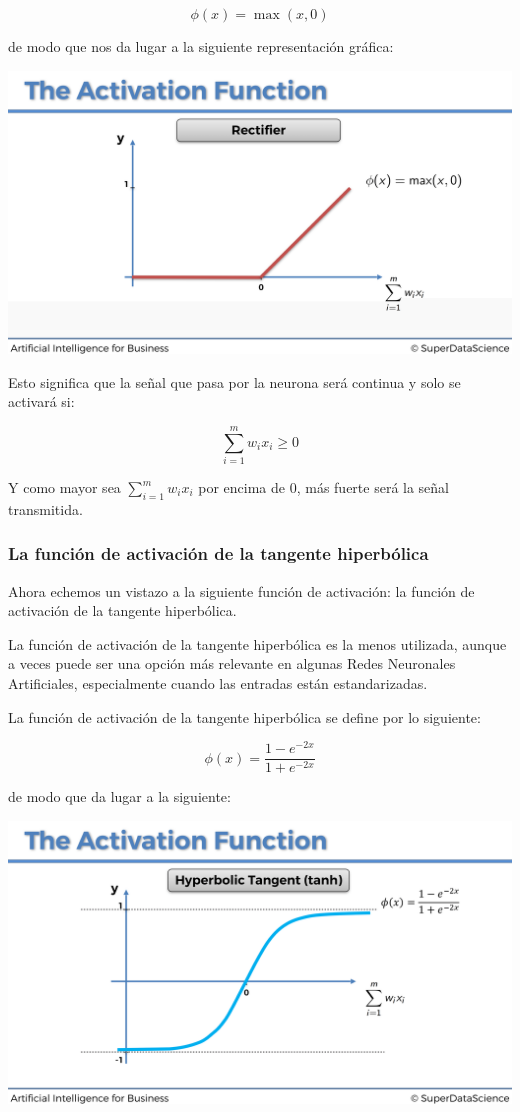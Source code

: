 \documentclass[
]{book}
\begin{document}
\[\phi(x) = \max(x,0)\]

de modo que nos da lugar a la siguiente representación gráfica:

\includegraphics{Images/ANN_12.png}

Esto significa que la señal que pasa por la neurona será continua y solo se activará si:

\[\sum_{i=1}^m w_i x_i \ge 0\]

Y como mayor sea \(\sum_{i=1}^m w_i x_i\) por encima de 0, más fuerte será la señal transmitida.

\hypertarget{la-funciuxf3n-de-activaciuxf3n-de-la-tangente-hiperbuxf3lica}{%
\subsubsection{La función de activación de la tangente hiperbólica}\label{la-funciuxf3n-de-activaciuxf3n-de-la-tangente-hiperbuxf3lica}}

Ahora echemos un vistazo a la siguiente función de activación: la función de activación de la tangente hiperbólica.

La función de activación de la tangente hiperbólica es la menos utilizada, aunque a veces puede ser una opción más relevante en algunas Redes Neuronales Artificiales, especialmente cuando las entradas están estandarizadas.

La función de activación de la tangente hiperbólica se define por lo siguiente:

\[\phi(x) = \frac{1-e^{-2x}}{1+e^{-2x}}\]

de modo que da lugar a la siguiente:

\includegraphics{Images/ANN_13.png}
\end{document}
